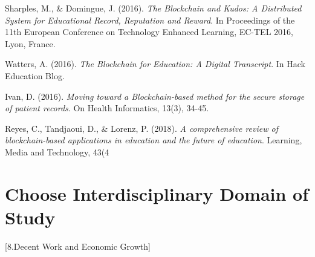 \documentclass[12pt]{report}
\begin{document}
\begin{thebibliography}{9}
Sharples, M., \& Domingue, J. (2016). \textit{The Blockchain and Kudos: A Distributed System for Educational Record, Reputation and Reward}. In Proceedings of the 11th European Conference on Technology Enhanced Learning, EC-TEL 2016, Lyon, France.

Watters, A. (2016). \textit{The Blockchain for Education: A Digital Transcript}. In Hack Education Blog.

Ivan, D. (2016). \textit{Moving toward a Blockchain-based method for the secure storage of patient records}. On Health Informatics, 13(3), 34-45.

Reyes, C., Tandjaoui, D., \& Lorenz, P. (2018). \textit{A comprehensive review of blockchain-based applications in education and the future of education}. Learning, Media and Technology, 43(4

\end{thebibliography}




\section{Choose Interdisciplinary Domain of Study}
[8.Decent Work and Economic Growth]
\end{document}
